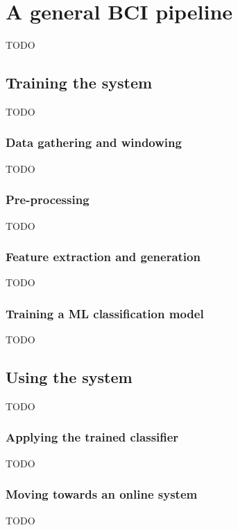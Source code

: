 
\chapter{A general BCI pipeline}
\label{ch:bci_pipeline}
TODO

\section{Training the system}
\label{sec:bci_pipeline_training}
TODO


\subsection{Data gathering and windowing}
\label{subsec:bci_pipeline_training_data_gathering_windowing}
TODO


\subsection{Pre-processing}
\label{subsec:bci_pipeline_training_preprocessing}
TODO


\subsection{Feature extraction and generation}
\label{subsec:bci_pipeline_training_features}
TODO


\subsection{Training a ML classification model}
\label{subsec:bci_pipeline_training_classification_model}
TODO

\section{Using the system}
\label{sec:bci_pipeline_using}
TODO


\subsection{Applying the trained classifier}
\label{subsec:bci_pipeline_using_classifier}
TODO


\subsection{Moving towards an online system}
\label{subsec:bci_pipeline_using_going_online}
TODO

